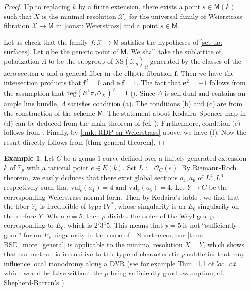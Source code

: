 \documentclass[11pt, letterpaper]{amsart}
\theoremstyle{plain}
\theoremstyle{definition}
\newtheorem{example}[theorem]{Example}
\newcommand{\IF}{\mathbb{F}}
\renewcommand{\deg}{\mathrm{deg}}
\newcommand{\<}{\langle}
\renewcommand{\>}{\rangle}
\newcommand{\sO}{\mathcal{O}}
\newcommand{\NS}{\mathrm{NS}}
\newcommand{\sfM}{\mathsf{M}}
\newcommand{\sX}{\mathcal{X}}
\newcommand{\val}{\mathrm{val}}
\begin{document}
\begin{proof}
    Up to replacing $k$ by a finite extension, there exists a point $s \in \sfM(k)$ such that $X$ is the minimal resolution $\breve{\sX}_s$ for the universal family of Weierstrass fibration $\sX \to \sfM$ in \cref{const: Weierstrass} and a point $s\in \sfM$. 

    Let us check that the family $f:\sX \to \sfM$ satisfies the hypotheses of \cref{set-up: surfaces}. 
    Let $\eta$ be the generic point of $\sfM$.
    We shall take the sublattice of polarization $\Lambda$ to be the subgroup of $\NS(\sX_\eta)_{\mathrm{tf}}$ generated by the classes of the zero section $\mathbf{e}$ and a general fiber in the elliptic fibration $\mathbf{f}$. 
    Then we have the intersection products that $\mathbf{f}^2 = 0$ and $\mathbf{e}. \mathbf{f} = 1$. 
    The fact that $\mathbf{e}^2 = -1$ follows from the assumption that $\deg (R^1 \pi_* \sO_X)^\vee  = 1$ (\cite[(II.3.6)]{Miranda}). 
    Since $\Lambda$ is self-dual and contains an ample line bundle,
    $\Lambda$ satisfies condition (a). 
    The conditions (b) and (c) are from the construction of the scheme $\sfM$. 
    The statement about Kodaira--Spencer map in (d) can be deduced from the main theorem of \cite{EGW24} (cf. \cite[Lem.~7.4.3]{HYZ}). 
    Furthermore, condition (e) follows from \cite[Lem.~7.3.3]{HYZ}. 
    Finally, by \cref{rmk: RDP on Weierstrass} above, we have (f). Now the result directly follows from \cref{thm: general theorem}. 
\end{proof}


\begin{example}
\label{exp: not good prime}
Let $C$ be a genus $1$ curve defined over a finitely generated extension $k$ of $\IF_p$ with a rational point $e \in E(k)$. 
Set $L := \sO_C(e)$. 
By Riemann-Roch theorem, we easily deduces that there exist global sections $a_4, a_6$ of $L^4, L^6$ respectively such that $\val_e(a_4) = 4$ and $\val_e(a_6) = 4$. 
Let $Y \to C$ be the corresponding Weierstrass normal form. Then by Kodaira's table \cite[p.41, IV.3.1]{Miranda}, we find that the fiber $Y_e$ is irreducible of type $\mathrm{IV}^*$, whose singularity is an $E_6$-singularity on the surface $Y$.
When $p = 5$, then $p$ divides the order of the Weyl group corresponding to $E_6$, which is $2^7 3^4 5$. 
This means that $p = 5$ is not ``sufficiently good'' for an $E_6$-singularity in the sense of \cite{Kou23}. 
Nonetheless, our \cref{thm: BSD_more_general} is applicable to the minimal resolution $X = \breve{Y}$, which shows that our method is insensitive to this type of characteristic $p$ subtleties that may influence local monodromy along a DVR (see for example Thm.~1.1 of \textit{loc. cit.} which would be false without the $p$ being sufficiently good assumption, cf. Shepherd-Barron's \cite[p.~598, Rmk(2)]{SBSing}). 
\end{example}
\end{document}
